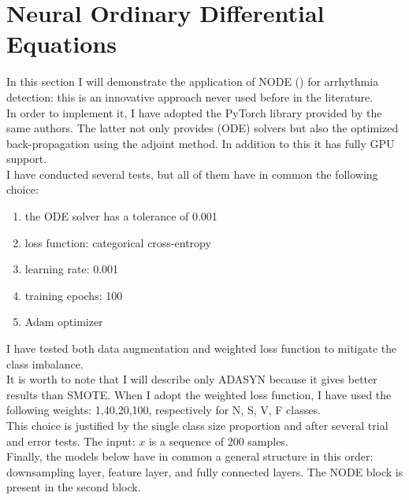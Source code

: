\documentclass[LaM,binding=0.6cm]{sapthesis}
\begin{document}
\section{Neural Ordinary Differential Equations}
In this section I will demonstrate the application of NODE (\cite{DBLP:journals/corr/abs-1806-07366}) for arrhythmia detection: this is an innovative approach never used before in the literature.\\In order to implement it, I have adopted the PyTorch library provided by the same authors. The latter not only provides (ODE) solvers but also the optimized back-propagation using the adjoint method. In addition to this it has fully GPU support.\\I have conducted several tests, but all of them have in common the following choice:
\begin{enumerate}
\item the ODE solver has a tolerance of 0.001
\item loss function: categorical cross-entropy
\item learning rate: 0.001
\item training epochs: 100
\item Adam optimizer 
\end{enumerate}
I have tested both data augmentation and weighted loss function to mitigate the class imbalance.\\It is worth to note that I will describe only ADASYN because it gives better results than SMOTE. When I adopt the weighted loss function, I have used the following weights: 1,40,20,100, respectively for N, S, V, F classes.\\This choice is justified by the single class size proportion and after several trial and error tests. The input: $x$ is a sequence of 200 samples.\\Finally, the models below have in common a general structure in this order: downsampling layer, feature layer, and fully connected layers. The NODE block is present in the second block.
\end{document}
